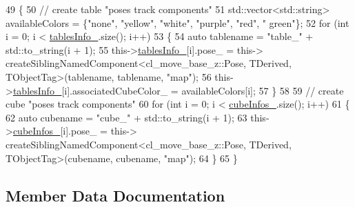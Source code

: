 \begin{DoxyCode}
49             \{
50                 \textcolor{comment}{// create table "poses track components"}
51                 std::vector<std::string> availableColors = \{\textcolor{stringliteral}{"none"}, \textcolor{stringliteral}{"yellow"}, \textcolor{stringliteral}{"white"}, \textcolor{stringliteral}{"purple"}, \textcolor{stringliteral}{"red"}, \textcolor{stringliteral}{"
      green"}\};
52                 \textcolor{keywordflow}{for} (\textcolor{keywordtype}{int} i = 0; i < \hyperlink{classsm__moveit__4_1_1cl__perception__system_1_1CpSceneState_a95f74dd16566d97e017650ccdf4b8a46}{tablesInfo\_}.size(); i++)
53                 \{
54                     \textcolor{keyword}{auto} tablename = \textcolor{stringliteral}{"table\_"} + std::to\_string(i + 1);
55                     this->\hyperlink{classsm__moveit__4_1_1cl__perception__system_1_1CpSceneState_a95f74dd16566d97e017650ccdf4b8a46}{tablesInfo\_}[i].pose\_ = this->
      createSiblingNamedComponent<cl\_move\_base\_z::Pose, TDerived, TObjectTag>(tablename, tablename, \textcolor{stringliteral}{"map"});
56                     this->\hyperlink{classsm__moveit__4_1_1cl__perception__system_1_1CpSceneState_a95f74dd16566d97e017650ccdf4b8a46}{tablesInfo\_}[i].associatedCubeColor\_ = availableColors[i];
57                 \}
58 
59                 \textcolor{comment}{// create cube "poses track components"}
60                 \textcolor{keywordflow}{for} (\textcolor{keywordtype}{int} i = 0; i < \hyperlink{classsm__moveit__4_1_1cl__perception__system_1_1CpSceneState_a734a45934cccf19ac5c886cd94bc8cda}{cubeInfos\_}.size(); i++)
61                 \{
62                     \textcolor{keyword}{auto} cubename = \textcolor{stringliteral}{"cube\_"} + std::to\_string(i + 1);
63                     this->\hyperlink{classsm__moveit__4_1_1cl__perception__system_1_1CpSceneState_a734a45934cccf19ac5c886cd94bc8cda}{cubeInfos\_}[i].pose\_ = this->
      createSiblingNamedComponent<cl\_move\_base\_z::Pose, TDerived, TObjectTag>(cubename, cubename, \textcolor{stringliteral}{"map"});
64                 \}
65             \}
\end{DoxyCode}


\subsection{Member Data Documentation}
\mbox{\label{classsm__moveit__4_1_1cl__perception__system_1_1CpSceneState_a734a45934cccf19ac5c886cd94bc8cda}} 
